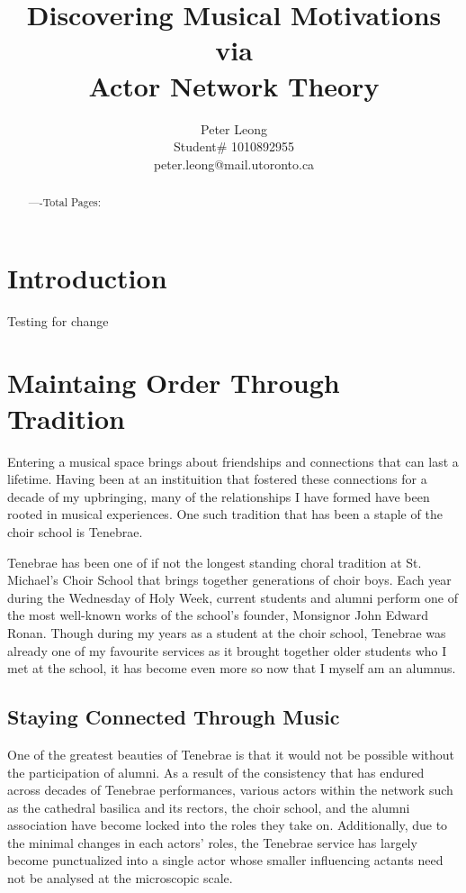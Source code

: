 \documentclass{article} %
\title{Discovering Musical Motivations via \\
Actor Network Theory}
\author{Peter Leong \\
Student\# 1010892955 \\
peter.leong@mail.utoronto.ca \\
\AND
}
\begin{document}
\maketitle

\vspace{-6ex}

\begin{abstract}
----Total Pages: \pageref{last_page}
\end{abstract}

\vspace{2ex}

\begin{multicols}{2}

\section{Introduction}

Testing for change

\section{Maintaing Order Through Tradition}

Entering a musical space brings about friendships and connections that can last a lifetime.
Having been at an instituition that fostered these connections for a decade of my upbringing, many of the relationships I have formed have been rooted in musical experiences.
One such tradition that has been a staple of the choir school is Tenebrae.

Tenebrae has been one of if not the longest standing choral tradition at St. Michael's Choir School that brings together generations of choir boys.
Each year during the Wednesday of Holy Week, current students and alumni perform one of the most well-known works of the school's founder, Monsignor John Edward Ronan.
Though during my years as a student at the choir school, Tenebrae was already one of my favourite services as it brought together older students who I met at the school, it has become even more so now that I myself am an alumnus.

\subsection{Staying Connected Through Music}

One of the greatest beauties of Tenebrae is that it would not be possible without the participation of alumni.
As a result of the consistency that has endured across decades of Tenebrae performances, various actors within the network such as the cathedral basilica and its rectors, the choir school, and the alumni association have become locked into the roles they take on.
Additionally, due to the minimal changes in each actors' roles, the Tenebrae service has largely become punctualized into a single actor whose smaller influencing actants need not be analysed at the microscopic scale.


\end{multicols}
\end{document}
